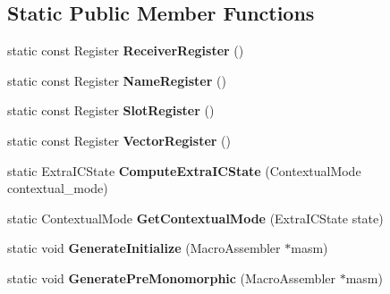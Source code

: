 \subsection*{Static Public Member Functions}
\begin{DoxyCompactItemize}
\item 
\hypertarget{classv8_1_1internal_1_1_load_i_c_ab249fcc567ff852d5b2eb6fd77eb9749}{}static const Register {\bfseries Receiver\+Register} ()\label{classv8_1_1internal_1_1_load_i_c_ab249fcc567ff852d5b2eb6fd77eb9749}

\item 
\hypertarget{classv8_1_1internal_1_1_load_i_c_a2b185072e583ed4c8a71daec4fd58d58}{}static const Register {\bfseries Name\+Register} ()\label{classv8_1_1internal_1_1_load_i_c_a2b185072e583ed4c8a71daec4fd58d58}

\item 
\hypertarget{classv8_1_1internal_1_1_load_i_c_ab6e524227d8a0254a213292790dca53a}{}static const Register {\bfseries Slot\+Register} ()\label{classv8_1_1internal_1_1_load_i_c_ab6e524227d8a0254a213292790dca53a}

\item 
\hypertarget{classv8_1_1internal_1_1_load_i_c_a94f9e55c89169a39472a3c309f220a98}{}static const Register {\bfseries Vector\+Register} ()\label{classv8_1_1internal_1_1_load_i_c_a94f9e55c89169a39472a3c309f220a98}

\item 
\hypertarget{classv8_1_1internal_1_1_load_i_c_a25196571c1fa93b2d91f8dc9ca366827}{}static Extra\+I\+C\+State {\bfseries Compute\+Extra\+I\+C\+State} (Contextual\+Mode contextual\+\_\+mode)\label{classv8_1_1internal_1_1_load_i_c_a25196571c1fa93b2d91f8dc9ca366827}

\item 
\hypertarget{classv8_1_1internal_1_1_load_i_c_aeb66baeb3d8e007cdcc627554254104c}{}static Contextual\+Mode {\bfseries Get\+Contextual\+Mode} (Extra\+I\+C\+State state)\label{classv8_1_1internal_1_1_load_i_c_aeb66baeb3d8e007cdcc627554254104c}

\item 
\hypertarget{classv8_1_1internal_1_1_load_i_c_aea13380abe2c9f22c3f41738912fea60}{}static void {\bfseries Generate\+Initialize} (Macro\+Assembler $\ast$masm)\label{classv8_1_1internal_1_1_load_i_c_aea13380abe2c9f22c3f41738912fea60}

\item 
\hypertarget{classv8_1_1internal_1_1_load_i_c_a0cfdb1f41a544b5ace52644b8024ba46}{}static void {\bfseries Generate\+Pre\+Monomorphic} (Macro\+Assembler $\ast$masm)\label{classv8_1_1internal_1_1_load_i_c_a0cfdb1f41a544b5ace52644b8024ba46}


\end{DoxyCompactItemize}
